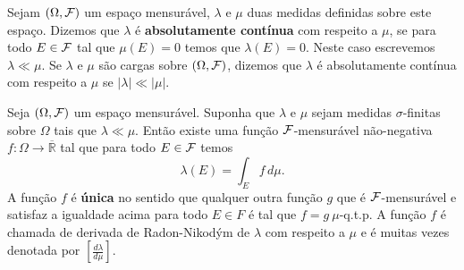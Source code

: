 \begin{definicao}\label{def-med-abs-cont.}
Sejam $(\Omega,\mathcal{F})$ um espaço mensurável, $\lambda$ e $\mu$
duas medidas definidas sobre este espaço. 
Dizemos que $\lambda$ é {\bf absolutamente contínua} 
com respeito a $\mu$, se para todo $E\in \mathcal{F}$
tal que $\mu(E)=0$ temos que $\lambda(E)=0$.
Neste caso escrevemos $\lambda \ll \mu$.
Se $\lambda$ e $\mu$ são cargas sobre $(\Omega,\mathcal{F})$,
dizemos que $\lambda$ é absolutamente contínua 
com respeito a $\mu$ se $|\lambda|\ll |\mu|$.
\end{definicao}







\begin{teorema}
\label{teo-radom-nikodym}
Seja $(\Omega,\mathcal{F})$ um espaço mensurável. Suponha que 
$\lambda$ e $\mu$ sejam medidas $\sigma$-finitas sobre $\Omega$ 
tais que $\lambda\ll \mu$. Então existe uma função 
$\mathcal{F}$-mensurável não-negativa $f:\Omega\to\overline{\mathbb{R}}$
tal que para todo $E\in\mathcal{F}$ temos
\[
\lambda(E) 
= 
\int_{E} f\, d\mu.
\]
A função $f$ é {\bf única} no sentido que qualquer 
outra função $g$ que é $\mathcal{F}$-mensurável 
e satisfaz a igualdade acima 
para todo $E\in F$ é tal que $f=g \ \mu$-q.t.p. 
A função $f$ é chamada de derivada de Radon-Nikodým 
de $\lambda$ com respeito a $\mu$ e é muitas vezes 
denotada por $\displaystyle\left[ \frac{d\lambda}{d\mu}\right]$.
\end{teorema}


